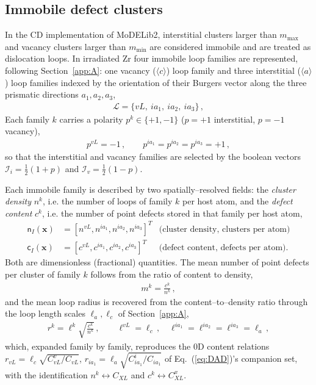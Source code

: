 \documentclass{article}
\newcommand{\spvec}[1]{\bm{\mathsf{#1}}}   %
\begin{document}
\subsection{Immobile defect clusters}
\label{sec:immobileClusters}

In the CD implementation of MoDELib2, interstitial clusters larger than $m_\text{max}$ and vacancy clusters larger than $m_\text{min}$ are considered immobile and are treated as dislocation loops. In irradiated Zr four immobile loop families are represented, following Section~\ref{app:A}: one vacancy ($\langle c\rangle$) loop family and three interstitial ($\langle a\rangle$) loop families indexed by the orientation of their Burgers vector along the three prismatic directions $a_1,a_2,a_3$,
\begin{align}
\mathcal{L}=\{vL,\ ia_1,\ ia_2,\ ia_3\}\, ,
\end{align}
Each family $k$ carries a polarity $p^k\in\{+1,-1\}$ ($p=+1$ interstitial, $p=-1$ vacancy),
\begin{align}
p^{vL}=-1\, ,\qquad p^{ia_1}=p^{ia_2}=p^{ia_3}=+1\, ,
\end{align}
so that the interstitial and vacancy families are selected by the boolean vectors $\mathcal{I}_i=\tfrac12(1+p)$ and $\mathcal{I}_v=\tfrac12(1-p)$.

Each immobile family is described by two spatially--resolved fields: the \emph{cluster density} $n^k$, i.e. the number of loops of family $k$ per host atom, and the \emph{defect content} $c^k$, i.e. the number of point defects stored in that family per host atom,
\begin{align}
\spvec{n}_I(\bm x)&=\left[n^{vL},n^{ia_1},n^{ia_2},n^{ia_3}\right]^T & \text{(cluster density, clusters per atom)}\\
\spvec{c}_I(\bm x)&=\left[c^{vL},c^{ia_1},c^{ia_2},c^{ia_3}\right]^T & \text{(defect content, defects per atom).}
\end{align}
Both are dimensionless (fractional) quantities. The mean number of point defects per cluster of family $k$ follows from the ratio of content to density,
\begin{align}\label{eq:mI}
m^k=\frac{c^k}{n^k}\, ,
\end{align}
and the mean loop radius is recovered from the content--to--density ratio through the loop length scales $\ell_a,\ell_c$ of Section~\ref{app:A},
\begin{align}\label{eq:rI}
r^k=\ell^k\sqrt{\frac{c^k}{n^k}}\, ,\qquad \ell^{vL}=\ell_c\, ,\quad \ell^{ia_1}=\ell^{ia_2}=\ell^{ia_3}=\ell_a\, ,
\end{align}
which, expanded family by family, reproduces the $0$D content relations $r_{vL}=\ell_c\sqrt{C_{vL}^{v}/C_{vL}}$, $r_{ia_1}=\ell_a\sqrt{C_{ia_1}^{i}/C_{ia_1}}$ of Eq.~(\ref{eq:DAD})'s companion set, with the identification $n^k\leftrightarrow C_{XL}$ and $c^k\leftrightarrow C_{XL}^{x}$.
\end{document}
